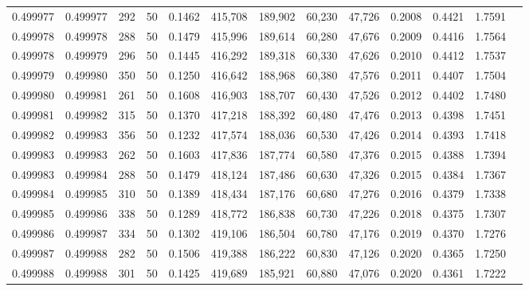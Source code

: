\begin{tabular}{rrrrrrrrrrrrr}
0.499977 & 0.499977 & 292 &  50 &                                     0.1462 & 415,708 & 189,902 &  60,230 &  47,726 & 0.2008 & 0.4421 & 1.7591 \\
0.499978 & 0.499978 & 288 &  50 &                                     0.1479 & 415,996 & 189,614 &  60,280 &  47,676 & 0.2009 & 0.4416 & 1.7564 \\
0.499978 & 0.499979 & 296 &  50 &                                     0.1445 & 416,292 & 189,318 &  60,330 &  47,626 & 0.2010 & 0.4412 & 1.7537 \\
0.499979 & 0.499980 & 350 &  50 &                                     0.1250 & 416,642 & 188,968 &  60,380 &  47,576 & 0.2011 & 0.4407 & 1.7504 \\
0.499980 & 0.499981 & 261 &  50 &                                     0.1608 & 416,903 & 188,707 &  60,430 &  47,526 & 0.2012 & 0.4402 & 1.7480 \\
0.499981 & 0.499982 & 315 &  50 &                                     0.1370 & 417,218 & 188,392 &  60,480 &  47,476 & 0.2013 & 0.4398 & 1.7451 \\
0.499982 & 0.499983 & 356 &  50 &                                     0.1232 & 417,574 & 188,036 &  60,530 &  47,426 & 0.2014 & 0.4393 & 1.7418 \\
0.499983 & 0.499983 & 262 &  50 &                                     0.1603 & 417,836 & 187,774 &  60,580 &  47,376 & 0.2015 & 0.4388 & 1.7394 \\
0.499983 & 0.499984 & 288 &  50 &                                     0.1479 & 418,124 & 187,486 &  60,630 &  47,326 & 0.2015 & 0.4384 & 1.7367 \\
0.499984 & 0.499985 & 310 &  50 &                                     0.1389 & 418,434 & 187,176 &  60,680 &  47,276 & 0.2016 & 0.4379 & 1.7338 \\
0.499985 & 0.499986 & 338 &  50 &                                     0.1289 & 418,772 & 186,838 &  60,730 &  47,226 & 0.2018 & 0.4375 & 1.7307 \\
0.499986 & 0.499987 & 334 &  50 &                                     0.1302 & 419,106 & 186,504 &  60,780 &  47,176 & 0.2019 & 0.4370 & 1.7276 \\
0.499987 & 0.499988 & 282 &  50 &                                     0.1506 & 419,388 & 186,222 &  60,830 &  47,126 & 0.2020 & 0.4365 & 1.7250 \\
0.499988 & 0.499988 & 301 &  50 &                                     0.1425 & 419,689 & 185,921 &  60,880 &  47,076 & 0.2020 & 0.4361 & 1.7222 \\

\end{tabular}
